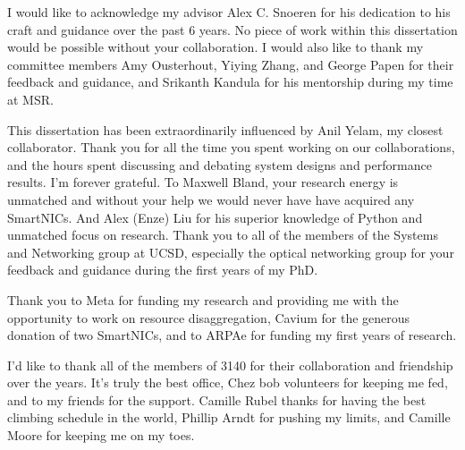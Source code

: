 \documentclass[12pt]{ucsddissertation}
\begin{document}
\tableofcontents
\listoffigures
\listoftables


\begin{acknowledgements}

I would like to acknowledge my advisor Alex C. Snoeren for his dedication to his craft and guidance
over the past 6 years. No piece of work within this dissertation would be possible without your
collaboration. I would also like to thank my committee members Amy Ousterhout, Yiying Zhang, and
George Papen for their feedback and guidance, and Srikanth Kandula for his mentorship during my time
at MSR.

This dissertation has been extraordinarily influenced by Anil Yelam, my closest collaborator. Thank you
for all the time you spent working on our collaborations, and the hours spent discussing and
debating system designs and performance results. I'm forever grateful. To Maxwell Bland, your
research energy is unmatched and without your help we would never have have acquired any SmartNICs.
And Alex (Enze) Liu for his superior knowledge of Python and unmatched focus on research.  Thank you
to all of the members of the Systems and Networking group at UCSD, especially the optical networking
group for your feedback and guidance during the first years of my PhD.

Thank you to Meta for funding my research and providing me with the opportunity to work on resource
disaggregation, Cavium for the generous donation of two SmartNICs, and to ARPAe for funding my first
years of research.

I'd like to thank all of the members of 3140 for their collaboration and friendship over the years.
It's truly the best office, Chez bob volunteers for keeping me fed, and to my friends for the
support. Camille Rubel thanks for having the best climbing schedule in the world, Phillip Arndt for
pushing my limits, and Camille Moore for keeping me on my toes.


\end{acknowledgements}
\end{document}
